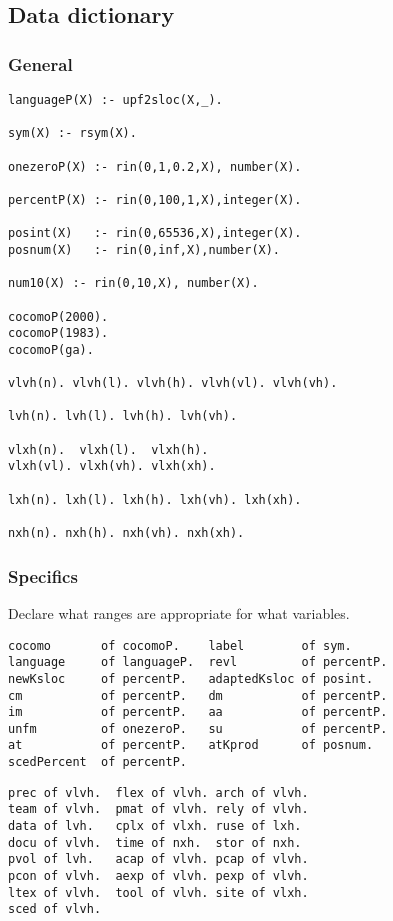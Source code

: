 \subsection{ Data dictionary
}
\subsubsection{ General
}
\begin{Verbatim}
languageP(X) :- upf2sloc(X,_).

sym(X) :- rsym(X).

onezeroP(X) :- rin(0,1,0.2,X), number(X).

percentP(X) :- rin(0,100,1,X),integer(X).

posint(X)   :- rin(0,65536,X),integer(X).
posnum(X)   :- rin(0,inf,X),number(X).

num10(X) :- rin(0,10,X), number(X).

cocomoP(2000).
cocomoP(1983).
cocomoP(ga).

vlvh(n). vlvh(l). vlvh(h). vlvh(vl). vlvh(vh).

lvh(n). lvh(l). lvh(h). lvh(vh).

vlxh(n).  vlxh(l).  vlxh(h).
vlxh(vl). vlxh(vh). vlxh(xh). 

lxh(n). lxh(l). lxh(h). lxh(vh). lxh(xh). 

nxh(n). nxh(h). nxh(vh). nxh(xh).
\end{Verbatim}
\subsubsection{ Specifics
}
Declare what ranges are appropriate for what variables.
\begin{Verbatim}
cocomo       of cocomoP.    label        of sym.
language     of languageP.  revl         of percentP.
newKsloc     of percentP.   adaptedKsloc of posint.
cm           of percentP.   dm           of percentP.
im           of percentP.   aa           of percentP.
unfm         of onezeroP.   su           of percentP.
at           of percentP.   atKprod      of posnum.
scedPercent  of percentP.
\end{Verbatim}
\begin{Verbatim}
prec of vlvh.  flex of vlvh. arch of vlvh.
team of vlvh.  pmat of vlvh. rely of vlvh.
data of lvh.   cplx of vlxh. ruse of lxh.
docu of vlvh.  time of nxh.  stor of nxh.
pvol of lvh.   acap of vlvh. pcap of vlvh.
pcon of vlvh.  aexp of vlvh. pexp of vlvh.
ltex of vlvh.  tool of vlvh. site of vlxh.
sced of vlvh.
\end{Verbatim}
